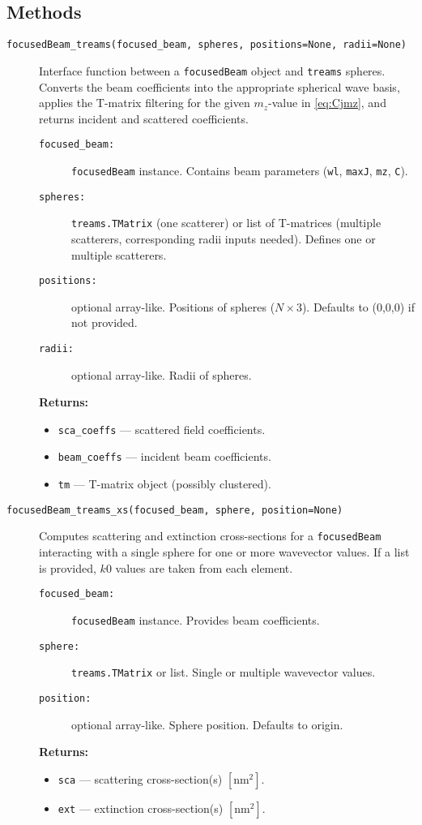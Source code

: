 \subsection{Methods}
\begin{description}
    \item[\texttt{focusedBeam\_treams(focused\_beam, spheres, positions=None, radii=None)}]
    Interface function between a \texttt{focusedBeam} object and \texttt{treams} spheres. Converts the beam coefficients into the appropriate spherical wave basis, applies the T-matrix filtering for the given \( m_z \)-value in \ref{eq:Cjmz}, and returns incident and scattered coefficients.
    \begin{description}
        \item[\texttt{focused\_beam:}] \texttt{focusedBeam} instance. Contains beam parameters (\texttt{wl}, \texttt{maxJ}, \texttt{mz}, \texttt{C}).
        \item[\texttt{spheres:}] \texttt{treams.TMatrix} (one scatterer) or list of T-matrices (multiple scatterers, corresponding radii inputs needed). Defines one or multiple scatterers.
        \item[\texttt{positions:}] optional array-like. Positions of spheres (\( N \times 3 \)). Defaults to (0,0,0) if not provided.
        \item[\texttt{radii:}] optional array-like. Radii of spheres.
    \end{description}
    \textbf{Returns:}
    \begin{itemize}
        \item \texttt{sca\_coeffs} — scattered field coefficients.
        \item \texttt{beam\_coeffs} — incident beam coefficients.
        \item \texttt{tm} — T-matrix object (possibly clustered).
    \end{itemize}

    \item[\texttt{focusedBeam\_treams\_xs(focused\_beam, sphere, position=None)}]
    Computes scattering and extinction cross-sections for a \texttt{focusedBeam} interacting with a single sphere for one or more wavevector values. If a list is provided, \( k0 \) values are taken from each element.
    \begin{description}
        \item[\texttt{focused\_beam:}] \texttt{focusedBeam} instance. Provides beam coefficients.
        \item[\texttt{sphere:}] \texttt{treams.TMatrix} or list. Single or multiple wavevector values.
        \item[\texttt{position:}] optional array-like. Sphere position. Defaults to origin.
    \end{description}
    \textbf{Returns:}
    \begin{itemize}
        \item \texttt{sca} — scattering cross-section(s) \([\text{nm}^2]\).
        \item \texttt{ext} — extinction cross-section(s) \([\text{nm}^2]\).
    \end{itemize}


\end{description}

